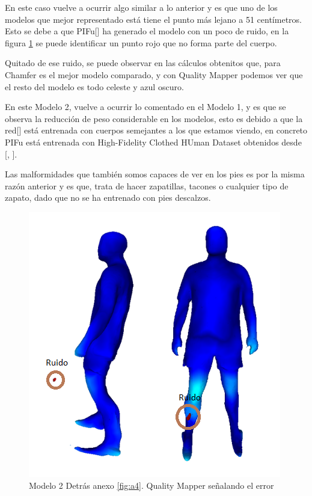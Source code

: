 En este caso vuelve a ocurrir algo similar a lo anterior y es que uno de los modelos que mejor representado está tiene el punto más lejano a 51 centímetros. Esto se debe a que PIFu[\cite{pifu}] ha generado el modelo con un poco de ruido, en la figura \ref{fig:andresdetras} se puede identificar un punto rojo que no forma parte del cuerpo.

Quitado de ese ruido, se puede observar en las cálculos obtenitos que, para Chamfer es el mejor modelo comparado, y con Quality Mapper podemos ver que el resto del modelo es todo celeste y azul oscuro.

En este Modelo 2, vuelve a ocurrir lo comentado en el Modelo 1, y es que se observa la reducción de peso considerable en los modelos, esto es debido a que la red[\cite{pifu}] está entrenada con cuerpos semejantes a los que estamos viendo, en concreto PIFu está entrenada con High-Fidelity Clothed HUman Dataset obtenidos desde [\cite{SiCloPe}, \cite{bodynet}]. 

Las malformidades que también somos capaces de ver en los pies es por la misma razón anterior y es que, trata de hacer zapatillas, tacones o cualquier tipo de zapato, dado que no se ha entrenado con pies descalzos.

\begin{figure}[H]
	\centering
	\includegraphics[scale=0.4]{imagenes/andresdetras.png}
	\caption{Modelo 2 Detrás anexo \ref{fig:a4}. Quality Mapper señalando el error}
	\label{fig:andresdetras}
\end{figure}


